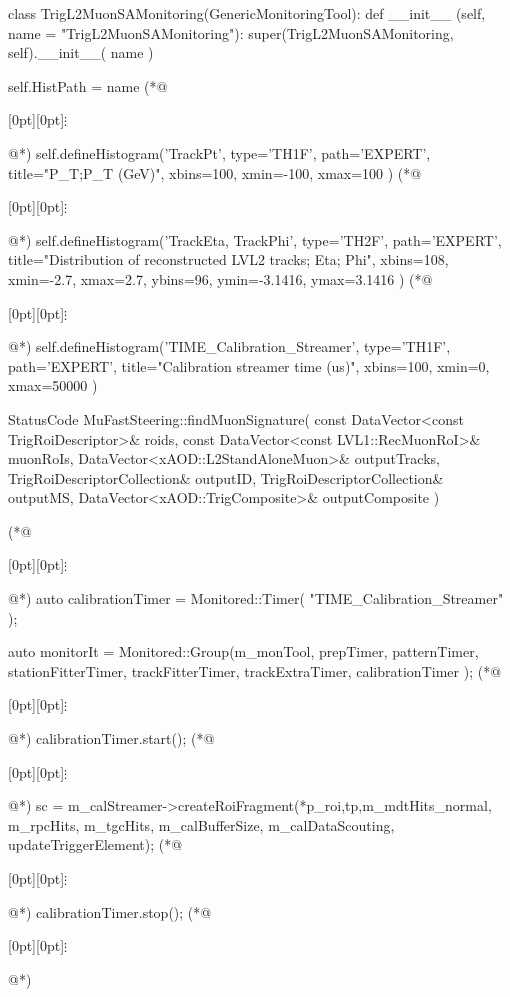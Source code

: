 \begin{python}[caption=Deklaracja histogramów, label={lst:athena:histogram_declaration}]
class TrigL2MuonSAMonitoring(GenericMonitoringTool):
    def __init__ (self, name = "TrigL2MuonSAMonitoring"):
        super(TrigL2MuonSAMonitoring, self).__init__( name )
    
        self.HistPath = name
(*@\centerline{\raisebox{-1pt}[0pt][0pt]{$\vdots$}}@*)
        self.defineHistogram('TrackPt', type='TH1F', path='EXPERT', title="P_{T};P_{T} (GeV)", xbins=100, xmin=-100, xmax=100 )
(*@\centerline{\raisebox{-1pt}[0pt][0pt]{$\vdots$}}@*)
        self.defineHistogram('TrackEta, TrackPhi', type='TH2F', path='EXPERT', title="Distribution of reconstructed LVL2 tracks; Eta; Phi", xbins=108, xmin=-2.7, xmax=2.7, ybins=96, ymin=-3.1416, ymax=3.1416 )
(*@\centerline{\raisebox{-1pt}[0pt][0pt]{$\vdots$}}@*)
        self.defineHistogram('TIME_Calibration_Streamer', type='TH1F', path='EXPERT', title="Calibration streamer time (us)", xbins=100, xmin=0, xmax=50000 )
\end{python}

\begin{cpp}[caption=TIME Calibration Streamer, label={lst:athena:time_calibration_streamer}]
StatusCode MuFastSteering::findMuonSignature(
  const DataVector<const TrigRoiDescriptor>& roids,
  const DataVector<const LVL1::RecMuonRoI>& muonRoIs,
  DataVector<xAOD::L2StandAloneMuon>& outputTracks,
  TrigRoiDescriptorCollection& outputID,
  TrigRoiDescriptorCollection& outputMS,
  DataVector<xAOD::TrigComposite>& outputComposite )
{
(*@\centerline{\raisebox{-1pt}[0pt][0pt]{$\vdots$}}@*)
  auto calibrationTimer = Monitored::Timer( "TIME_Calibration_Streamer" );

  auto monitorIt	= Monitored::Group(m_monTool, prepTimer, patternTimer, stationFitterTimer, trackFitterTimer, trackExtraTimer, calibrationTimer );
(*@\centerline{\raisebox{-1pt}[0pt][0pt]{$\vdots$}}@*)
  calibrationTimer.start();
(*@\centerline{\raisebox{-1pt}[0pt][0pt]{$\vdots$}}@*)
  sc = m_calStreamer->createRoiFragment(*p_roi,tp,m_mdtHits_normal, m_rpcHits, m_tgcHits, m_calBufferSize, m_calDataScouting, updateTriggerElement); 
(*@\centerline{\raisebox{-1pt}[0pt][0pt]{$\vdots$}}@*)
  calibrationTimer.stop();
(*@\centerline{\raisebox{-1pt}[0pt][0pt]{$\vdots$}}@*)
}
\end{cpp}

